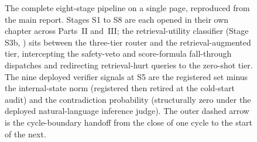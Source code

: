 \begin{figure}[p]
{%
}
\caption[The complete eight-stage pipeline]{The complete eight-stage \caem{} pipeline
on a single page, reproduced from the main report. Stages S1 to S8 are each opened in
their own chapter across Parts~II and~III; the retrieval-utility classifier
(Stage S3b, ) sits between the three-tier router and the
retrieval-augmented tier, intercepting the safety-veto and score-formula
fall-through dispatches and redirecting retrieval-hurt queries to the zero-shot tier.
The nine deployed verifier signals at S5 are the registered set minus the
internal-state norm (registered then retired at the cold-start audit) and the
contradiction probability (structurally zero under the deployed natural-language
inference judge). The outer dashed arrow is the cycle-boundary handoff from the close
of one cycle to the start of the next.}
\label{fig:full-pipeline}
\end{figure}